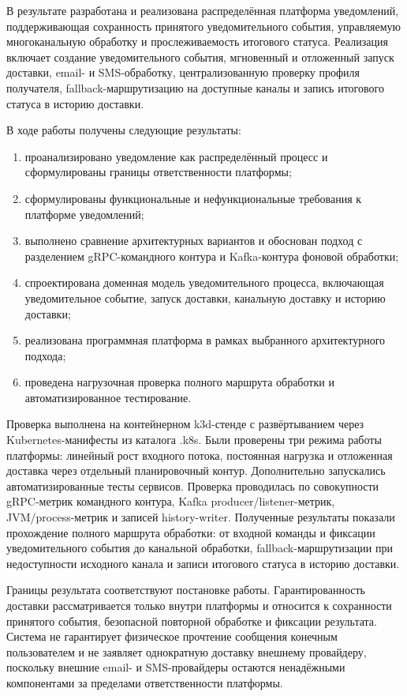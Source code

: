 \conclusion

В результате разработана и реализована распределённая платформа уведомлений, поддерживающая сохранность принятого уведомительного события, управляемую многоканальную обработку и прослеживаемость итогового статуса. Реализация включает создание уведомительного события, мгновенный и отложенный запуск доставки, email- и SMS-обработку, централизованную проверку профиля получателя, fallback-маршрутизацию на доступные каналы и запись итогового статуса в историю доставки.

В ходе работы получены следующие результаты:
\begin{enumerate}
    \item проанализировано уведомление как распределённый процесс и сформулированы границы ответственности платформы;
    \item сформулированы функциональные и нефункциональные требования к платформе уведомлений;
    \item выполнено сравнение архитектурных вариантов и обоснован подход с разделением gRPC-командного контура и Kafka-контура фоновой обработки;
    \item спроектирована доменная модель уведомительного процесса, включающая уведомительное событие, запуск доставки, канальную доставку и историю доставки;
    \item реализована программная платформа в рамках выбранного архитектурного подхода;
    \item проведена нагрузочная проверка полного маршрута обработки и автоматизированное тестирование.
\end{enumerate}

Проверка выполнена на контейнерном k3d-стенде с развёртыванием через Kubernetes-манифесты из каталога .k8s. Были проверены три режима работы платформы: линейный рост входного потока, постоянная нагрузка и отложенная доставка через отдельный планировочный контур. Дополнительно запускались автоматизированные тесты сервисов. Проверка проводилась по совокупности gRPC-метрик командного контура, Kafka producer/listener-метрик, JVM/process-метрик и записей history-writer. Полученные результаты показали прохождение полного маршрута обработки: от входной команды и фиксации уведомительного события до канальной обработки, fallback-маршрутизации при недоступности исходного канала и записи итогового статуса в историю доставки.

Границы результата соответствуют постановке работы. Гарантированность доставки рассматривается только внутри платформы и относится к сохранности принятого события, безопасной повторной обработке и фиксации результата. Система не гарантирует физическое прочтение сообщения конечным пользователем и не заявляет однократную доставку внешнему провайдеру, поскольку внешние email- и SMS-провайдеры остаются ненадёжными компонентами за пределами ответственности платформы.

